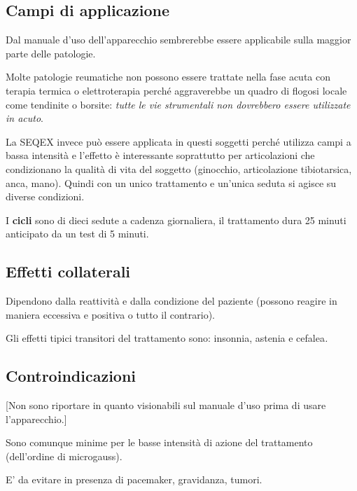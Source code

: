 \subsection{Campi di applicazione}

Dal manuale d'uso dell'apparecchio sembrerebbe essere applicabile sulla
maggior parte delle patologie.

Molte patologie reumatiche non possono essere trattate nella fase acuta
con terapia termica o elettroterapia perché aggraverebbe un quadro di
flogosi locale come tendinite o borsite: \emph{tutte le vie strumentali
non dovrebbero essere utilizzate in acuto}.

La SEQEX invece può essere applicata in questi soggetti perché utilizza
campi a bassa intensità e l'effetto è interessante soprattutto per
articolazioni che condizionano la qualità di vita del soggetto
(ginocchio, articolazione tibiotarsica, anca, mano). Quindi con un unico
trattamento e un'unica seduta si agisce su diverse condizioni.

I \textbf{cicli} sono di dieci sedute a cadenza giornaliera, il
trattamento dura 25 minuti anticipato da un test di 5 minuti.

\subsection{Effetti collaterali}

Dipendono dalla reattività e dalla condizione del paziente (possono
reagire in maniera eccessiva e positiva o tutto il contrario).

Gli effetti tipici transitori del trattamento sono: insonnia, astenia e
cefalea\emph{.}

\subsection{Controindicazioni }

{[}Non sono riportare in quanto visionabili sul manuale d'uso prima di
usare l'apparecchio.{]}

Sono comunque minime per le basse intensità di azione del trattamento
(dell'ordine di microgauss).

E' da evitare in presenza di pacemaker, gravidanza, tumori.
